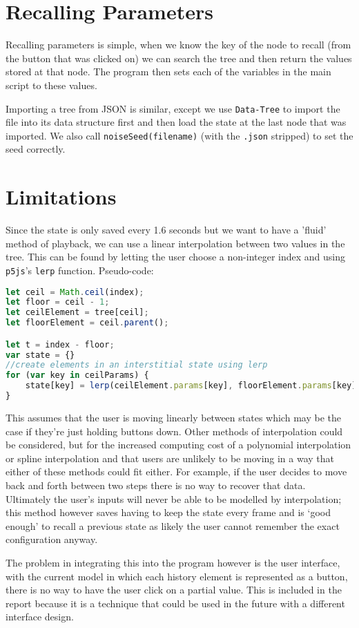 \section{Recalling Parameters}
Recalling parameters is simple, when we know the key of the node to recall (from
the button that was clicked on) we can search the tree and then return the
values stored at that node. The program then sets each of the variables in the
main script to these values.

Importing a tree from JSON is similar, except we use \verb|Data-Tree| to import
the file into its data structure first and then load the state at the last node
that was imported. We also call \verb|noiseSeed(filename)| (with the
\verb|.json| stripped) to set the seed correctly.

\section{Limitations}
Since the state is only saved every 1.6 seconds but we want to have a 'fluid'
method of playback, we can use a linear interpolation between two values in the
tree. This can be found by letting the user choose a non-integer index and using
\verb|p5js|'s \verb|lerp| function. Pseudo-code:

\begin{lstlisting}[language=javascript]
let ceil = Math.ceil(index);
let floor = ceil - 1;
let ceilElement = tree[ceil];
let floorElement = ceil.parent();

let t = index - floor;
var state = {}
//create elements in an interstitial state using lerp
for (var key in ceilParams) {
    state[key] = lerp(ceilElement.params[key], floorElement.params[key], t);
}
\end{lstlisting}

This assumes that the user is moving linearly between states which
may be the case if they're just holding buttons down. Other methods of
interpolation could be considered, but for the increased computing cost of a
polynomial interpolation or spline interpolation and that users are
unlikely to be moving in a way that either of these methods could fit either.
For example, if the user decides to move back and forth between two steps there
is no way to recover that data. Ultimately the user's inputs will never be able
to be modelled by interpolation; this method however saves having to keep the
state every frame and is `good enough' to recall a previous state as likely the
user cannot remember the exact configuration anyway.

The problem in integrating this into the program however is the user interface,
with the current model in which each history element is represented as a button,
there is no way to have the user click on a partial value. This is included in
the report because it is a technique that could be used in the future with a
different interface design.
